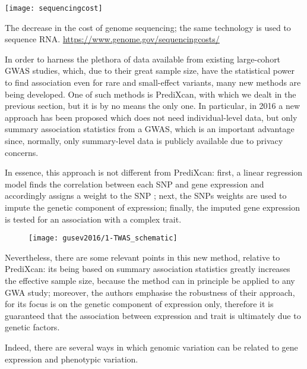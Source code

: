 \documentclass[../main.tex]{subfiles}
\begin{document}
\begin{marginfigure}[-4cm]
	\texttt{[image: sequencingcost]}
	\caption[Sequencing cost over time]{The decrease in the cost of 
	genome sequencing; the same technology is used to sequence RNA. 
	\url{https://www.genome.gov/sequencingcosts/}}
\end{marginfigure}

In order to harness the plethora of data available from existing 
large-cohort GWAS studies, which, due to their great sample size, have 
the statistical power to find association even for rare and small-effect 
variants, many new methods are being developed. One of such methods is 
PrediXcan, with which we dealt in the previous section, but it is by no 
means the only one. In particular, in 2016 a new approach has been 
proposed which does not need individual-level data, but only summary 
association statistics from a GWAS, 
which is an important advantage since, normally, only summary-level data 
is publicly available due to privacy concerns.

In essence, this approach is not different from PrediXcan: first, a 
linear regression model finds the correlation between each SNP and gene 
expression and accordingly assigns a weight to the SNP ; 
next, the SNPs weights are used to impute the \cis genetic component of 
expression; finally, the imputed gene expression is tested for an 
association  with a complex trait.

\begin{figure}
	\texttt{[image: gusev2016/1-TWAS\_schematic]}
	\caption{}
\end{figure}

Nevertheless, there are some relevant points in this new method, 
relative to PrediXcan: its being based on summary association statistics 
greatly increases the effective sample size, because the method can in 
principle be applied to any GWA study; moreover, the authors emphasise 
the robustness of their approach, for its focus is on the genetic 
component of expression only, therefore it is guaranteed that the 
association between expression and trait is ultimately due to genetic 
factors.

Indeed, there are several ways in which genomic variation can be related 
to gene expression and phenotypic variation.
\end{document}
